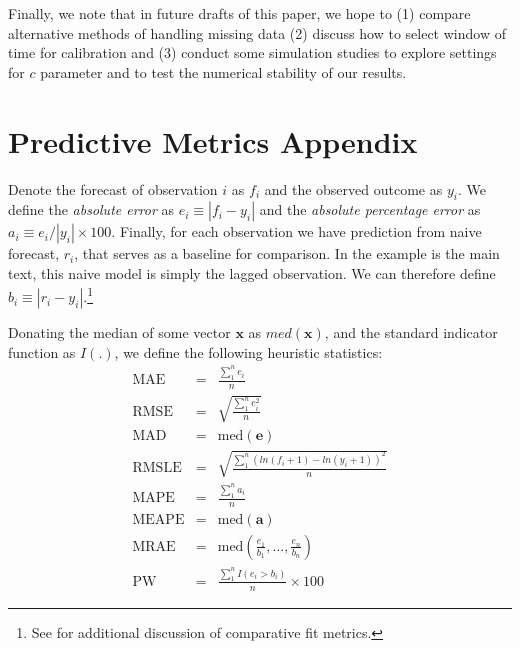 \documentclass[12pt,fullpage,endnotes]{article}
\begin{document}

Finally, we note that in future drafts of this paper, we hope to (1)
compare alternative methods of handling missing data (2) discuss how
to select window of time for calibration and (3) conduct some
simulation studies to explore settings for $c$ parameter and to test
the numerical stability of our results.




 \newpage
 \appendix


 \section*{Predictive Metrics Appendix}

 Denote the forecast of observation $i$ as $f_i$ and the observed
 outcome as $y_i$.  We define the \textit{absolute error} as
 $e_i\equiv |f_i - y_i|$ and the \textit{absolute percentage error} as
 $a_i \equiv e_i / |y_i| \times 100$.  Finally, for each observation we have
 prediction from naive forecast, $r_i$, that serves as a baseline for
 comparison.  In the example is the main text, this naive model is
 simply the lagged observation.  We can therefore define $b_i \equiv
 |r_i - y_i|$.\footnote{See \citet{brandt:freeman:schrodt:2011} for
   additional discussion of comparative fit metrics.}

 Donating the median of some vector $\mathbf{x}$ as $med(\mathbf{x})$,
 and the standard indicator function as $I(.)$, we define the following heuristic statistics:
 \begin{eqnarray*}
 \mathrm{MAE} &=& \frac{\sum_1^n{e_i}}{n}\\
  \mathrm{RMSE} &=& \sqrt{\frac{\sum_1^n{e^2_i}}{n}} \\
  \mathrm{MAD} &=& \mathrm{med}(\mathbf{e}) \\
  \mathrm{RMSLE} &=& \sqrt{\frac{\sum_1^n\left(ln(f_i+1) - ln(y_i+1)  \right)^2}{n}} \\
  \mathrm{MAPE} &=& \frac{\sum_1^n{a_i}}{n} \\
   \mathrm{MEAPE} &=& \mathrm{med}(\mathbf{a}) \\
 \mathrm{MRAE} &=& \mathrm{med}\left(\frac{e_1}{b_1}, \ldots, \frac{e_n}{b_n} \right) \\
 \mathrm{PW} &=& \frac{\sum_1^nI(e_i > b_i)}{n} \times 100
\end{eqnarray*}



\singlespacing


\end{document}
